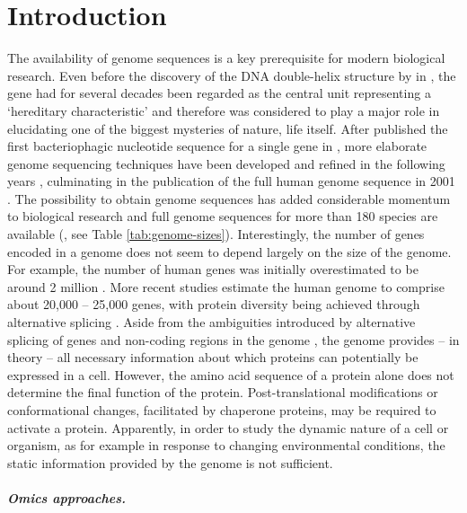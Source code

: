 \chapter{Introduction}

The availability of genome sequences is a key prerequisite for modern 
biological research.
Even before the discovery of the DNA double-helix structure by 
\citeauthor{Watson1953} in \citeyear{Watson1953}, the gene had for several 
decades been regarded as the central unit representing a 
`hereditary characteristic' \citep{Vries1889} and therefore was considered
to play a major role in elucidating one of the biggest mysteries of nature, 
life itself.
After \citeauthor{Jou1972} published the first bacteriophagic nucleotide 
sequence for a single gene in \citeyear{Jou1972}, more elaborate genome 
sequencing techniques have been developed and refined in the following years
\citep{Gilbert1973, Sanger1975, Maxam1977}, culminating in the publication of 
the full human genome sequence in 2001 \citep{Venter2001}.
The possibility to obtain genome sequences has added considerable momentum
to biological research and full genome sequences for more than 180 species
are available (\cite{Yates2009}, see Table \ref{tab:genome-sizes}).
Interestingly, the number of genes encoded in a genome does not seem to depend
largely on the size of the genome.
For example, the number of human genes was initially overestimated to be around 
2 million \citep{Kauffman1969}.
More recent studies estimate the human genome to comprise about 20,000 -- 25,000 
genes, with protein diversity being achieved through alternative splicing 
\citep{Rubin2004}.
Aside from the ambiguities introduced by alternative splicing of genes 
\citep{Black2003} and non-coding regions in the genome \citep{Gilbert1978},
the genome provides -- in theory -- all necessary information about which 
proteins can potentially be expressed in a cell.
However, the amino acid sequence of a protein alone does not determine the 
final function of the protein.
Post-translational modifications or conformational changes, facilitated by
chaperone proteins, may be required to activate a protein.
Apparently, in order to study the dynamic nature of a cell or organism, as for 
example in response to changing environmental conditions, the static information
provided by the genome is not sufficient. 

\paragraph{Omics approaches.}

